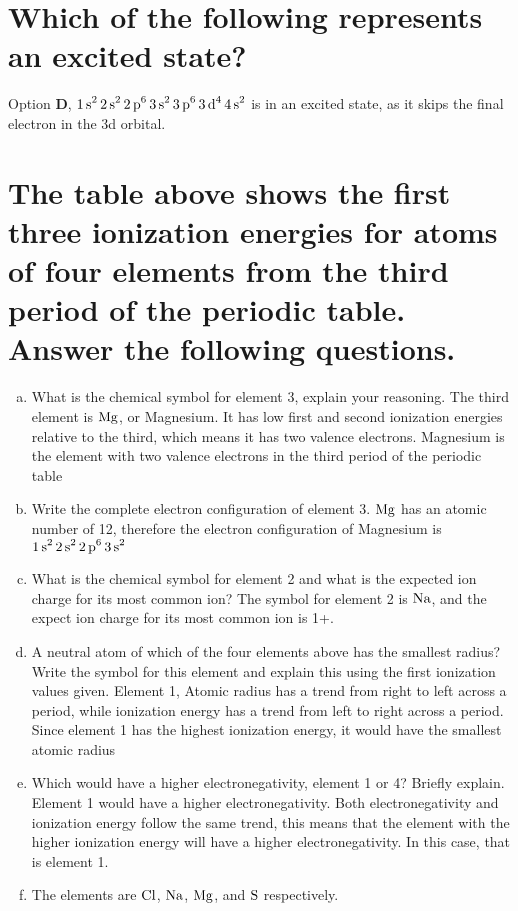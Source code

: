 \documentclass[11pt]{article}
\begin{document}
\section{Which of the following represents an excited state?}
\label{sec:org1c4a441}
Option \textbf{D}, \(\ce{1s^2 2s^2 2p^6 3s^2 3p^6 3d^4 4s^2}\) is in an excited state, as it skips the final electron in the 3d orbital.

\section{The table above shows the first three ionization energies for atoms of four elements from the third period of the periodic table. Answer the following questions.}
\label{sec:org4bb48f4}
\begin{enumerate}[(a)]
\item What is the chemical symbol for element 3, explain your reasoning.
The third element is \(\ce{Mg}\), or Magnesium. It has low first and second ionization energies relative to the third, which means it has two valence electrons. Magnesium is the element with two valence electrons in the third period of the periodic table

\item Write the complete electron configuration of element 3.
\(\ce{Mg}\) has an atomic number of 12, therefore the electron configuration of Magnesium is \(\ce{1s^2 2s^2 2p^6 3s^2}\)

\item What is the chemical symbol for element 2 and what is the expected ion charge for its most common ion?
The symbol for element 2 is \(\ce{Na}\), and the expect ion charge for its most common ion is 1+.

\item A neutral atom of which of the four elements above has the smallest radius? Write the symbol for this element and explain this using the first ionization values given.
Element 1, Atomic radius has a trend from right to left across a period, while ionization energy has a trend from left to right across a period. Since element 1 has the highest ionization energy, it would have the smallest atomic radius

\item Which would have a higher electronegativity, element 1 or 4? Briefly explain.
Element 1 would have a higher electronegativity. Both electronegativity and ionization energy follow the same trend, this means that the element with the higher ionization energy will have a higher electronegativity. In this case, that is element 1.

\item The elements are \(\ce{Cl}\), \(\ce{Na}\), \(\ce{Mg}\), and \(\ce{S}\) respectively.
\end{enumerate}
\end{document}
